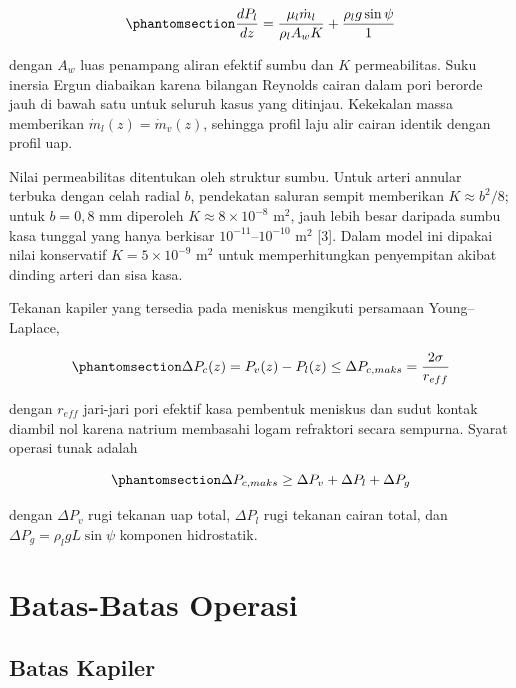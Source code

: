 \documentclass[
  indonesian,
  12pt,
  a4paper,
]{report}
\begin{document}
\begin{equation}\protect\phantomsection\label{eq-darcy}{\frac{dP_l}{dz} = \frac{\mu_l \dot m_l}{\rho_l A_w K} + \frac{\rho_l g \sin\psi}{1}}\end{equation}

dengan \(A_w\) luas penampang aliran efektif sumbu dan \(K\)
permeabilitas. Suku inersia Ergun diabaikan karena bilangan Reynolds
cairan dalam pori berorde jauh di bawah satu untuk seluruh kasus yang
ditinjau. Kekekalan massa memberikan \(\dot m_l(z) = \dot m_v(z)\),
sehingga profil laju alir cairan identik dengan profil uap.

Nilai permeabilitas ditentukan oleh struktur sumbu. Untuk arteri annular
terbuka dengan celah radial \(b\), pendekatan saluran sempit memberikan
\(K \approx b^{2}/8\); untuk \(b = 0{,}8\) mm diperoleh
\(K \approx 8 \times 10^{-8}\) m\(^{2}\), jauh lebih besar daripada
sumbu kasa tunggal yang hanya berkisar \(10^{-11}\)--\(10^{-10}\)
m\(^{2}\) {[}3{]}. Dalam model ini dipakai nilai konservatif
\(K = 5 \times 10^{-9}\) m\(^{2}\) untuk memperhitungkan penyempitan
akibat dinding arteri dan sisa kasa.

Tekanan kapiler yang tersedia pada meniskus mengikuti persamaan
Young--Laplace,

\begin{equation}\protect\phantomsection\label{eq-laplace}{\Delta P_{c}(z) = P_v(z) - P_l(z) \le \Delta P_{c,maks} = \frac{2\sigma}{r_{eff}}}\end{equation}

dengan \(r_{eff}\) jari-jari pori efektif kasa pembentuk meniskus dan
sudut kontak diambil nol karena natrium membasahi logam refraktori
secara sempurna. Syarat operasi tunak adalah

\begin{equation}\protect\phantomsection\label{eq-neraca-tekanan}{\Delta P_{c,maks} \ge \Delta P_v + \Delta P_l + \Delta P_g}\end{equation}

dengan \(\Delta P_v\) rugi tekanan uap total, \(\Delta P_l\) rugi
tekanan cairan total, dan \(\Delta P_g = \rho_l g L \sin\psi\) komponen
hidrostatik.

\section{Batas-Batas Operasi}\label{batas-batas-operasi}

\subsection{Batas Kapiler}\label{batas-kapiler}
\end{document}
